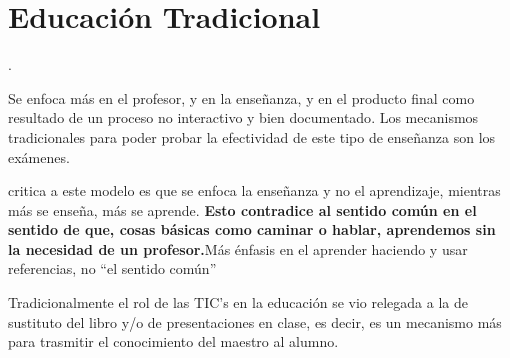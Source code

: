\section{Educación Tradicional}

\cite{johnson2005instructionism}.

Se enfoca más en el profesor, y en la enseñanza, y en el producto final como
resultado de un proceso no interactivo y bien
documentado\cite{igi:instructionism}. Los mecanismos tradicionales para poder
probar la efectividad de este tipo de enseñanza son los exámenes.

 critica a este modelo es que se enfoca la
enseñanza y no el aprendizaje, mientras más se enseña, más se aprende.
\textbf{Esto contradice al sentido común en el sentido de que, cosas básicas
    como caminar o hablar, aprendemos sin la necesidad de un
    profesor\cite{ackoff:education}\cite{johnson2005instructionism}.}{Más
    énfasis en el aprender haciendo y usar referencias, no ``el sentido común''}

Tradicionalmente el rol de las TIC's en la educación se vio relegada a la de
sustituto del libro y/o de presentaciones en clase, es decir, es un mecanismo
más para trasmitir el conocimiento del maestro al alumno.

